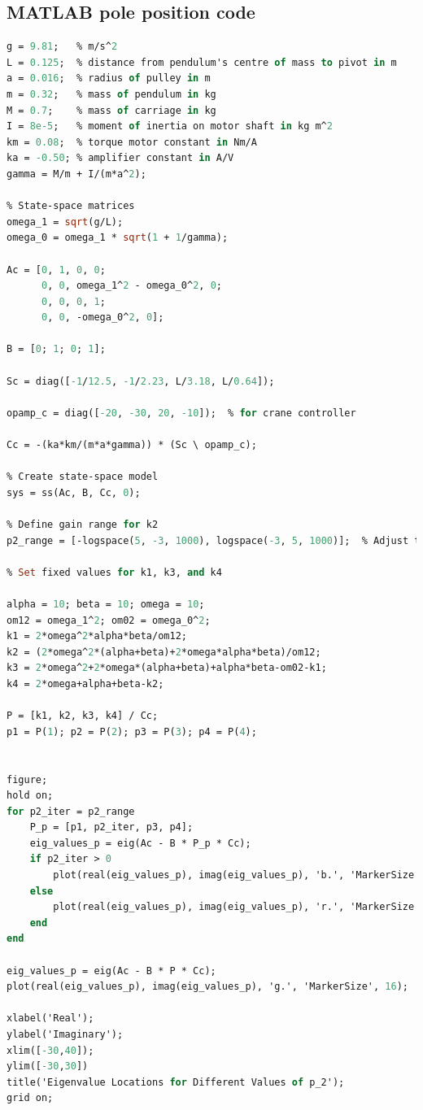 \documentclass{article}
\begin{document}
\subsection{MATLAB pole position code}

\begin {lstlisting}[language=ML]
g = 9.81;   %
L = 0.125;  %
a = 0.016;  %
m = 0.32;   %
M = 0.7;    %
I = 8e-5;   %
km = 0.08;  %
ka = -0.50; %
gamma = M/m + I/(m*a^2);

omega_1 = sqrt(g/L);
omega_0 = omega_1 * sqrt(1 + 1/gamma);

Ac = [0, 1, 0, 0;
      0, 0, omega_1^2 - omega_0^2, 0;
      0, 0, 0, 1;
      0, 0, -omega_0^2, 0];

B = [0; 1; 0; 1];

Sc = diag([-1/12.5, -1/2.23, L/3.18, L/0.64]);

opamp_c = diag([-20, -30, 20, -10]);  %

Cc = -(ka*km/(m*a*gamma)) * (Sc \ opamp_c);

sys = ss(Ac, B, Cc, 0);

p2_range = [-logspace(5, -3, 1000), logspace(-3, 5, 1000)];  %


alpha = 10; beta = 10; omega = 10;
om12 = omega_1^2; om02 = omega_0^2;
k1 = 2*omega^2*alpha*beta/om12;
k2 = (2*omega^2*(alpha+beta)+2*omega*alpha*beta)/om12;
k3 = 2*omega^2+2*omega*(alpha+beta)+alpha*beta-om02-k1;
k4 = 2*omega+alpha+beta-k2;

P = [k1, k2, k3, k4] / Cc;
p1 = P(1); p2 = P(2); p3 = P(3); p4 = P(4);


figure;
hold on;
for p2_iter = p2_range
    P_p = [p1, p2_iter, p3, p4];
    eig_values_p = eig(Ac - B * P_p * Cc);
    if p2_iter > 0
        plot(real(eig_values_p), imag(eig_values_p), 'b.', 'MarkerSize', 8);
    else
        plot(real(eig_values_p), imag(eig_values_p), 'r.', 'MarkerSize', 8);
    end
end

eig_values_p = eig(Ac - B * P * Cc);
plot(real(eig_values_p), imag(eig_values_p), 'g.', 'MarkerSize', 16);

xlabel('Real');
ylabel('Imaginary');
xlim([-30,40]);
ylim([-30,30])
title('Eigenvalue Locations for Different Values of p_2');
grid on;

\end{lstlisting}
\end{document}
